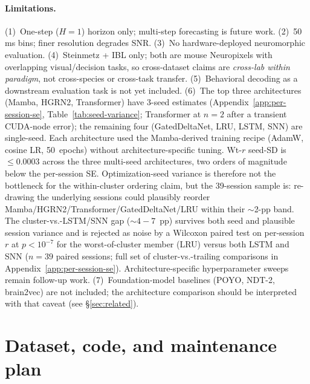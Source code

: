 \documentclass{article}
\begin{document}
\paragraph{Limitations.}
(1)~One-step ($H{=}1$) horizon only; multi-step forecasting is future
work.  (2)~50\,ms bins; finer resolution degrades SNR.
(3)~No hardware-deployed neuromorphic evaluation.
(4)~Steinmetz + IBL only; both are mouse Neuropixels with overlapping
visual/decision tasks, so cross-dataset claims are \emph{cross-lab
within paradigm}, not cross-species or cross-task transfer.
(5)~Behavioral decoding as a downstream evaluation task is not yet
included.  (6)~The top three architectures (Mamba, HGRN2, Transformer) have
3-seed estimates (Appendix~\ref{app:per-session-se},
Table~\ref{tab:seed-variance}; Transformer at $n{=}2$ after a
transient CUDA-node error); the remaining four (GatedDeltaNet, LRU,
LSTM, SNN) are single-seed.  Each architecture used the Mamba-derived
training recipe (AdamW, cosine LR, 50~epochs) without
architecture-specific tuning.  Wt-$r$ seed-SD is $\leq 0.0003$ across
the three multi-seed architectures, two orders of
magnitude below the per-session SE.  Optimization-seed variance is
therefore not the bottleneck for the within-cluster ordering claim,
but the 39-session sample is: re-drawing the underlying sessions
could plausibly reorder Mamba/HGRN2/Transformer/GatedDeltaNet/LRU within
their $\sim$2-pp band.  The cluster-vs.-LSTM/SNN gap (${\sim}4{-}7$~pp)
survives both seed and plausible session variance and is rejected as
noise by a Wilcoxon paired test on per-session~$r$ at
$p{<}10^{-7}$ for the worst-of-cluster member (LRU) versus both
LSTM and SNN ($n{=}39$ paired sessions; full set of
cluster-vs.-trailing comparisons in Appendix~\ref{app:per-session-se}).
Architecture-specific hyperparameter sweeps remain follow-up work.  (7)~Foundation-model baselines (POYO, NDT-2,
brain2vec) are not included; the architecture comparison should be
interpreted with that caveat (see \S\ref{sec:related}).


\section{Dataset, code, and maintenance plan}
\label{sec:release}
\end{document}
